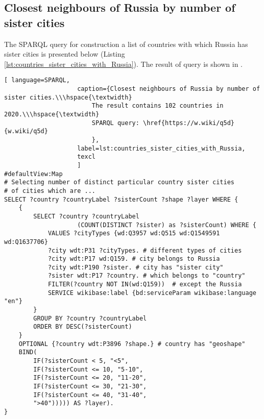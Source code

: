 \subsection{Closest neighbours of Russia by number of sister cities}

The SPARQL query for construction a list of countries with which Russia has sister cities is presented below (Listing \ref{lst:countries_sister_cities_with_Russia}). The result of query is shown in .

\begin{lstlisting}[ language=SPARQL, 
                    caption={Closest neighbours of Russia by number of sister cities.\\\hspace{\textwidth}
                        The result contains 102 countries in 2020.\\\hspace{\textwidth}
                        SPARQL query: \href{https://w.wiki/q5d}{w.wiki/q5d}
                        },
                    label=lst:countries_sister_cities_with_Russia,
                    texcl 
                    ]
#defaultView:Map
# Selecting number of distinct particular country sister cities 
# of cities which are ...
SELECT ?country ?countryLabel ?sisterCount ?shape ?layer WHERE {
	{ 
		SELECT ?country ?countryLabel 
					(COUNT(DISTINCT ?sister) as ?sisterCount) WHERE {  
			VALUES ?cityTypes {wd:Q3957 wd:Q515 wd:Q1549591 wd:Q1637706}
			?city wdt:P31 ?cityTypes. # different types of cities
			?city wdt:P17 wd:Q159. # city belongs to Russia
			?city wdt:P190 ?sister. # city has "sister city"
			?sister wdt:P17 ?country. # which belongs to "country"
			FILTER(?country NOT IN(wd:Q159))  # except the Russia
			SERVICE wikibase:label {bd:serviceParam wikibase:language "en"}
		}
		GROUP BY ?country ?countryLabel
		ORDER BY DESC(?sisterCount)
	}
	OPTIONAL {?country wdt:P3896 ?shape.} # country has "geoshape"
	BIND(
		IF(?sisterCount < 5, "<5",
		IF(?sisterCount <= 10, "5-10",
		IF(?sisterCount <= 20, "11-20",
		IF(?sisterCount <= 30, "21-30",
		IF(?sisterCount <= 40, "31-40",
		">40"))))) AS ?layer).
}
\end{lstlisting}%


